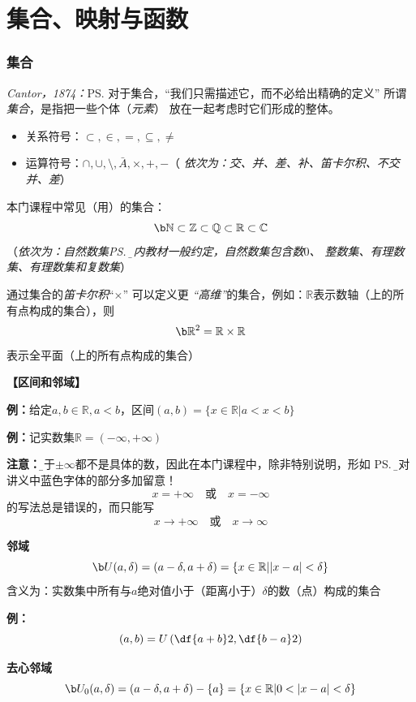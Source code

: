 
\section{集合、映射与函数}

\subsubsection{集合}

{\it Cantor，1874：}\ps{对于集合，“我们只需描述它，而不必给出精确的定义”}
所谓{\it 集合}，是指把一些个体（{\it 元素}） 放在一起考虑时它们形成的整体。
\begin{itemize}
  \setlength{\itemindent}{1cm}
  \item 关系符号：$\subset, \in, =, \subseteq, \neq$
  \item 运算符号：$\cap,\cup, \setminus, \bar{A}, \times, +, - $\quad （{\it
  依次为：交、并、差、补、笛卡尔积、不交并、差}）
\end{itemize}
	
本门课程中常见（用）的集合：
$$\b\mathbb{N}\subset\mathbb{Z}\subset\mathbb{Q}
\subset\mathbb{R}\subset\mathbb{C}$$
\quad（{\it 依次为：自然数集\ps{\b 国内教材一般约定，自然数集包含数$0$}、
整数集、有理数集、有理数集和复数集}）


通过集合的{\it 笛卡尔积}“$\times$” 可以定义更{\it
“高维”}的集合，例如：$\mathbb{R}$表示数轴（上的所有点构成的集合），则
$${\b \mathbb{R}^2=\mathbb{R}\times\mathbb{R}}$$
表示全平面（上的所有点构成的集合）

{\bf 【区间和邻域】}

{\bf 例：}给定$a,b\in\mathbb{R},a<b$，区间$(a,b)=\{x\in\mathbb{R}|a<x<b\}$

{\bf 例：}记实数集$\mathbb{R}=(-\infty,+\infty)$

{\bf 注意：}{\b 由于$\pm\infty$都不是具体的数，因此在本门课程中，除非特别说明，形如
\ps{\b 请对讲义中蓝色字体的部分多加留意！}
$$x=+\infty\quad\mbox{或}\quad x=-\infty$$
的写法总是错误的，而只能写
$$x\to+\infty\quad\mbox{或}\quad x\to\infty$$
}

{\bf 邻域}
$${\b U(a,\delta)}=(a-\delta,a+\delta)=\{x\in\mathbb{R}||x-a|<\delta\}$$
含义为：实数集中所有与$a$绝对值小于（距离小于）$\delta$的数（点）构成的集合

{\bf 例：}
$$(a,b)=U\left(\df{a+b}2,\df{b-a}2\right)$$

{\bf 去心邻域}
$${\b
U_0(a,\delta)}=(a-\delta,a+\delta)-\{a\}=\{x\in\mathbb{R}|0<|x-a|<\delta\}$$

